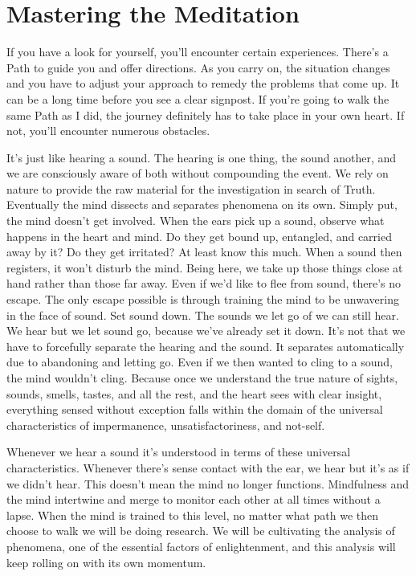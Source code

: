 \section{Mastering the Meditation}

If you have a look for yourself, you'll encounter certain experiences. There's a Path to guide you and offer directions. As you carry on, the situation changes and you have to adjust your approach to remedy the problems that come up. It can be a long time before you see a clear signpost. If you're going to walk the same Path as I did, the journey definitely has to take place in your own heart. If not, you'll encounter numerous obstacles.

It's just like hearing a sound. The hearing is one thing, the sound another, and we are consciously aware of both without compounding the event. We rely on nature to provide the raw material for the investigation in search of Truth. Eventually the mind dissects and separates phenomena on its own. Simply put, the mind doesn't get involved. When the ears pick up a sound, observe what happens in the heart and mind. Do they get bound up, entangled, and carried away by it? Do they get irritated? At least know this much. When a sound then registers, it won't disturb the mind. Being here, we take up those things close at hand rather than those far away. Even if we'd like to flee from sound, there's no escape. The only escape possible is through training the mind to be unwavering in the face of sound. Set sound down. The sounds we let go of we can still hear. We hear but we let sound go, because we've already set it down. It's not that we have to forcefully separate the hearing and the sound. It separates automatically due to abandoning and letting go. Even if we then wanted to cling to a sound, the mind wouldn't cling. Because once we understand the true nature of sights, sounds, smells, tastes, and all the rest, and the heart sees with clear insight, everything sensed without exception falls within the domain of the universal characteristics of impermanence, unsatisfactoriness, and not-self.

Whenever we hear a sound it's understood in terms of these universal characteristics. Whenever there's sense contact with the ear, we hear but it's as if we didn't hear. This doesn't mean the mind no longer functions. Mindfulness and the mind intertwine and merge to monitor each other at all times without a lapse. When the mind is trained to this level, no matter what path we then choose to walk we will be doing research. We will be cultivating the analysis of phenomena, one of the essential factors of enlightenment, and this analysis will keep rolling on with its own momentum.

